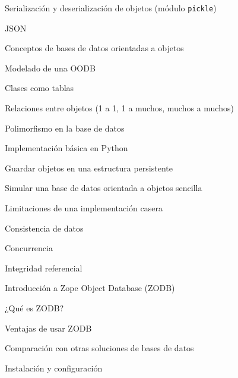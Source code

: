 \begin{longenum}
\begin{longenum}
        \begin{longenum}
            \item Serialización y deserialización de objetos (módulo \texttt{pickle})
            \item JSON
        \end{longenum}
        \item Conceptos de bases de datos orientadas a objetos
        \begin{longenum}
            \item Modelado de una OODB
            \begin{longenum}
                \item Clases como tablas
                \item Relaciones entre objetos (1 a 1, 1 a muchos, muchos a muchos)
                \item Polimorfismo en la base de datos
            \end{longenum}
            \item Implementación básica en Python
            \begin{longenum}
                \item Guardar objetos en una estructura persistente
                \item Simular una base de datos orientada a objetos sencilla
            \end{longenum}
            \item Limitaciones de una implementación casera
            \begin{longenum}
                \item Consistencia de datos
                \item Concurrencia
                \item Integridad referencial
            \end{longenum}
        \end{longenum}
        \item Introducción a Zope Object Database (ZODB)
        \begin{longenum}
            \item ¿Qué es ZODB?
            \begin{longenum}
                \item Ventajas de usar ZODB
                \item Comparación con otras soluciones de bases de datos
            \end{longenum}
            \item Instalación y configuración

\end{longenum}
\end{longenum}
\end{longenum}

